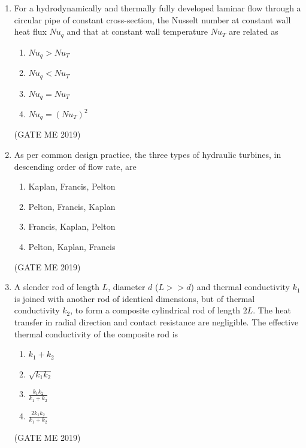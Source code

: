 \documentclass[journal]{IEEEtran}
\begin{document}
\begin{enumerate}
\item For a hydrodynamically and thermally fully developed laminar flow through a circular pipe of constant cross-section, the Nusselt number at constant wall heat flux $ Nu_q $ and that at constant wall temperature $ Nu_T $ are related as
\begin{multicols}{2}
\begin{enumerate}
    \item $ Nu_q > Nu_T $
    \item $ Nu_q < Nu_T $
    \item $ Nu_q = Nu_T $
    \item $ Nu_q = (Nu_T)^2 $
\end{enumerate}
\end{multicols}
\hfill (GATE ME 2019)

\item As per common design practice, the three types of hydraulic turbines, in descending order of flow rate, are
\begin{enumerate}
    \item Kaplan, Francis, Pelton
    \item Pelton, Francis, Kaplan
    \item Francis, Kaplan, Pelton
    \item Pelton, Kaplan, Francis
\end{enumerate}
\hfill (GATE ME 2019)

\item A slender rod of length $ L $, diameter $ d $ ($ L >> d $) and thermal conductivity $ k_1 $ is joined with another rod of identical dimensions, but of thermal conductivity $ k_2 $, to form a composite cylindrical rod of length $ 2L $. The heat transfer in radial direction and contact resistance are negligible. The effective thermal conductivity of the composite rod is
\begin{multicols}{2}
\begin{enumerate}
    \item $ k_1 + k_2 $
    \item $ \sqrt{k_1 k_2} $
    \item $ \frac{k_1 k_2}{k_1 + k_2} $
    \item $ \frac{2k_1 k_2}{k_1 + k_2} $
\end{enumerate}
\end{multicols}
\hfill (GATE ME 2019)


\end{enumerate}
\end{document}
